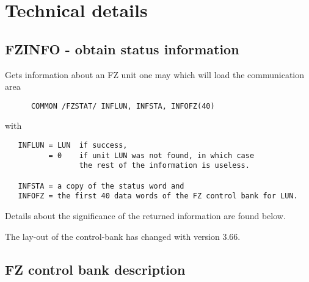 \chapter{Technical details}
\label{sec:H1-FZ-thecnical-details}

\section{FZINFO - obtain status information}
\label{sec:FZINFO}


Gets information about an FZ unit  one may
which will load the communication area

\begin{verbatim}
      COMMON /FZSTAT/ INFLUN, INFSTA, INFOFZ(40)
\end{verbatim}

with

\begin{verbatim}
   INFLUN = LUN  if success,
          = 0    if unit LUN was not found, in which case
                 the rest of the information is useless.

   INFSTA = a copy of the status word and
   INFOFZ = the first 40 data words of the FZ control bank for LUN.
\end{verbatim}

Details about the significance of the returned information are
found below.


The lay-out of the control-bank has changed with version 3.66.

\section{FZ control bank description}

